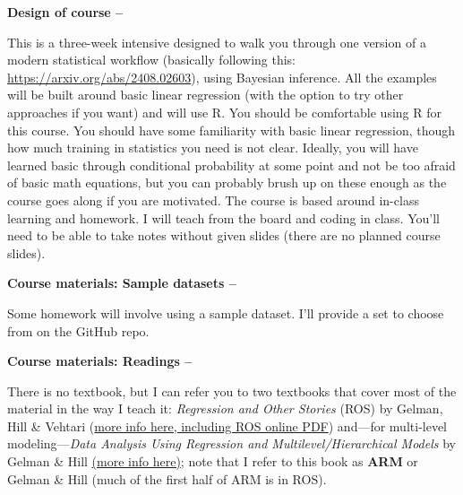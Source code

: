\documentclass[11pt]{article}
\begin{document}


\begin{large}
{\raggedright \textbf{Design of course --}}
\end{large}
 This is a three-week intensive designed to walk you through one version of a modern statistical workflow (basically following this: \url{https://arxiv.org/abs/2408.02603}), using Bayesian inference. All the examples will be built around basic linear regression (with the option to try other approaches if you want) and will use R. You should be comfortable using R for this course.  You should have some familiarity with basic linear regression, though how much training in statistics you need is not clear. Ideally, you will have learned basic through conditional probability at some point and not be too afraid of basic math equations, but you can probably brush up on these enough as the course goes along if you are motivated. The course is based around in-class learning and homework. I will teach from the board and coding in class. You'll need to be able to take notes without given slides (there are no planned course slides). \\

\begin{large}
{\raggedright \textbf{Course materials: Sample datasets --}}
\end{large}
Some homework will involve using a sample dataset. I'll provide a set to choose from on the GitHub repo.\\

\begin{large}
{\raggedright \textbf{Course materials: Readings --}}
\end{large}
There is no textbook, but I can refer you to two textbooks that cover most of the material in the way I teach it: \emph{Regression and Other Stories} (ROS) by Gelman, Hill \& Vehtari (\href{https://avehtari.github.io/ROS-Examples/}{more info here, including ROS online PDF}) and---for multi-level modeling---\emph{Data Analysis Using Regression and Multilevel/Hierarchical Models} by Gelman \& Hill \href{http://www.stat.columbia.edu/~gelman/arm/}{(more info here)}; note that I refer to this book as {\bf ARM} or Gelman \& Hill (much of the first half of ARM is in ROS). \\
\end{document}
